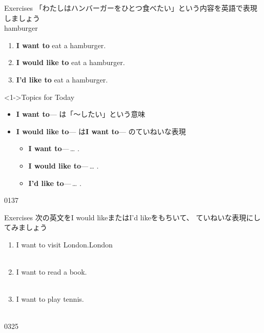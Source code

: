 \documentclass[aspectratio=169,xcolor={dvipsnames,table}]{beamer}
\begin{document}
\begin{frame}[plain]{Exercises}
「わたしはハンバーガーをひとつ食べたい」という内容を英語で表現しましょう\\
\hfill{\scriptsize hamburger }
\large
 \begin{enumerate}
  \item<2-> \textbf{I want to} eat a hamburger.
  \item<3-> \textbf{I would like to} eat a hamburger.\hfill{\scriptsize {}}
  \item<4-> {\bfseries I'd like to} eat a hamburger.
 \end{enumerate}

\begin{block}<1->{Topics for Today}\small
\begin{itemize}[square]\small
 \item \textbf{I want to}---\,\,は「～したい」という意味
 \item \textbf{I would like to}---\,\,は\textbf{I want to}---\,\,のていねいな表現
\begin{itemize}[circle]\small
 \item \textbf{I want to}---\,\ldots\,\,.
 \item \textbf{I would like to}---\,\ldots\,\,.
 \item \textbf{I'd like to}---\,\ldots\,\,.
       \end{itemize}
\end{itemize}
\end{block}
\vspace{-10pt}
\hfill{\tiny 0137}\,{\scriptsize {}}

\end{frame}
\begin{frame}[plain]{Exercises}
次の英文をI would likeまたはI'd likeをもちいて、 ていねいな表現にしてみましょう
 \begin{enumerate}
  \item I want to visit London.\hfill{\scriptsize London }\\
\\
  \item I want to read a book.\\
\\
  \item I want to play tennis.\\
\\
 \end{enumerate}
\hfill{\tiny 0325}\,{\scriptsize {}}

\end{frame}
\end{document}
